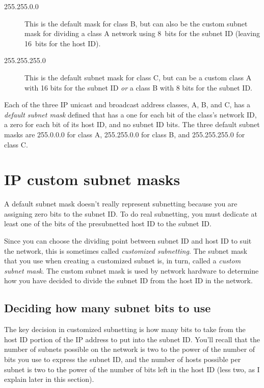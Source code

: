 \begin{description}
   \item[255.255.0.0]
      This is the default mask for class B, but can also be the custom subnet mask for dividing a class A network using 8~bits for the subnet ID
      (leaving 16~bits for the host ID).

   \item[255.255.255.0]
      This is the default subnet mask for class C, but can be a custom class A with 16 bits for the subnet ID \emph{or} a class B with 8 bits for the subnet ID.
\end{description}


\begin{keyconcept}
Each of the three IP unicast and broadcast address classes, A, B, and C, has a \emph{default subnet mask} defined
that has a one for each bit of the class's network ID, a zero for each bit of its host ID, and no subnet ID bits.
The three default subnet masks are 255.0.0.0 for class A, 255.255.0.0 for class B, and 255.255.255.0 for class C.
\end{keyconcept}




\section{IP custom subnet masks}
\label{sec:ip-custom-subnet-masks}

A default subnet mask doesn't really represent subnetting because you
are assigning zero bits to the subnet ID. To do real subnetting, you
must dedicate at least one of the bits of the presubnetted host ID to
the subnet ID.

Since you can choose the dividing point between subnet ID and host ID to suit the network, this is sometimes called \emph{customized subnetting}.
The subnet mask that you use when creating a customized subnet is, in turn, called a \emph{custom subnet mask}.
The custom subnet mask is used by network hardware to determine how you have decided to divide the subnet ID from the host ID in the network.



\subsection{Deciding how many subnet bits to use}

The key decision in customized subnetting is how many bits to take from
the host ID portion of the IP address to put into the subnet ID.
You'll recall that the number of subnets
possible on the network is two to the power of the number of bits you
use to express the subnet ID, and the number of hosts possible per
subnet is two to the power of the number of bits left in the host ID
(less two, as I explain later in this section).

